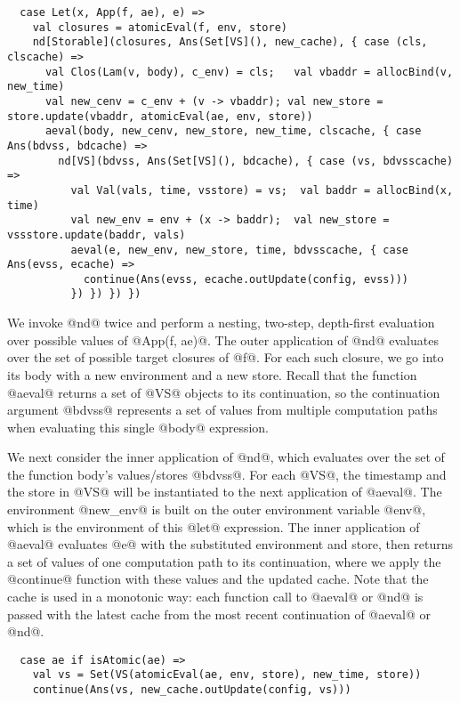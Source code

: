 \documentclass[acmsmall, screen]{acmart}\settopmatter{}
\begin{document}
\begin{lstlisting}
  case Let(x, App(f, ae), e) =>
    val closures = atomicEval(f, env, store)
    nd[Storable](closures, Ans(Set[VS](), new_cache), { case (cls, clscache) =>
      val Clos(Lam(v, body), c_env) = cls;   val vbaddr = allocBind(v, new_time)
      val new_cenv = c_env + (v -> vbaddr); val new_store = store.update(vbaddr, atomicEval(ae, env, store))
      aeval(body, new_cenv, new_store, new_time, clscache, { case Ans(bdvss, bdcache) =>
        nd[VS](bdvss, Ans(Set[VS](), bdcache), { case (vs, bdvsscache) =>
          val Val(vals, time, vsstore) = vs;  val baddr = allocBind(x, time)
          val new_env = env + (x -> baddr);  val new_store = vssstore.update(baddr, vals)
          aeval(e, new_env, new_store, time, bdvsscache, { case Ans(evss, ecache) =>
            continue(Ans(evss, ecache.outUpdate(config, evss)))
          }) }) }) })
\end{lstlisting}

We invoke @nd@ twice and perform a nesting, two-step, depth-first evaluation over
possible values of @App(f, ae)@.
The outer application of @nd@ evaluates over the set of possible target closures of
@f@. For each such closure, we go into its body with a new environment and a new store.
Recall that the function @aeval@ returns a set of @VS@ objects to its continuation,
so the continuation argument @bdvss@ represents a set of values from multiple computation
paths when evaluating this single @body@ expression.

We next consider the inner application of @nd@, which evaluates over the set of the function body's
values/stores @bdvss@. For each @VS@, the timestamp and the store in @VS@ will be
instantiated to the next application of @aeval@. The environment @new_env@ is built on
the outer environment variable @env@, which is the environment of this @let@ expression.
The inner application of @aeval@ evaluates @e@ with the substituted environment and store,
then returns a set of values of one computation path to its continuation, where we
apply the @continue@ function with these values and the updated cache.
Note that the cache is used in a monotonic way: each function call to @aeval@ or @nd@
is passed with the latest cache from the most recent continuation of @aeval@ or @nd@.

\begin{lstlisting}
  case ae if isAtomic(ae) =>
    val vs = Set(VS(atomicEval(ae, env, store), new_time, store))
    continue(Ans(vs, new_cache.outUpdate(config, vs)))
\end{lstlisting}
\end{document}
